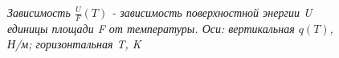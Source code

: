 \documentclass[a4paper, fontsize = 14pt]{article}
\begin{document}
\begin{figure}[hbt]
\caption{\textit{Зависимость $\frac{U}{F}(T)$ - зависимость поверхностной энергии U единицы площади F от температуры. Оси: вертикальная $q(T)$, Н/м; горизонтальная T, K}}
\end{figure}
\end{document}

